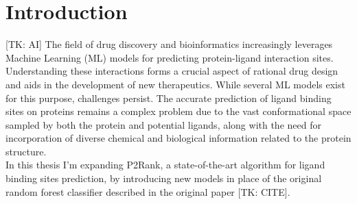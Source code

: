 \chapter*{Introduction}

[TK: AI] The field of drug discovery and bioinformatics increasingly leverages Machine Learning (ML) models for predicting protein-ligand interaction sites. Understanding these interactions forms a crucial aspect of rational drug design and aids in the development of new therapeutics. While several ML models exist for this purpose, challenges persist. The accurate prediction of ligand binding sites on proteins remains a complex problem due to the vast conformational space sampled by both the protein and potential ligands, along with the need for incorporation of diverse chemical and biological information related to the protein structure. \\

In this thesis I'm expanding P2Rank, a state-of-the-art algorithm for ligand binding sites prediction, by introducing new models in place of the original random forest classifier described in the original paper [TK: CITE].
